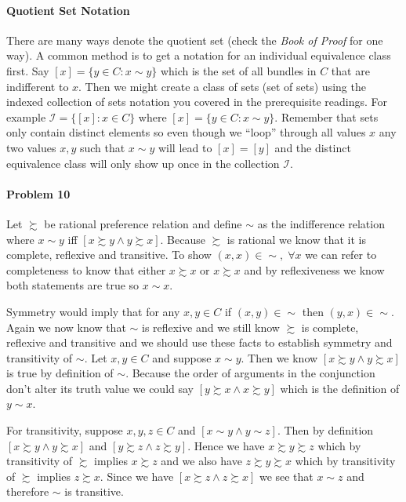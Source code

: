 \documentclass[10pt]{article}
\begin{document}
\paragraph{Quotient Set Notation}
There are many ways denote the quotient set (check the \emph{Book of Proof} for one way).
A common method is to get a notation for an individual equivalence class first.
Say $[x] = \{ y \in C: x \sim y\}$ which is the set of all bundles in $C$ that are indifferent to $x$.
Then we might create a class of sets (set of sets) using the indexed collection of sets notation you covered in the prerequisite readings.
For example $\mathcal{I} = \{ [x] : x \in C\}$ where $[x]=\{ y \in C: x \sim y\}$.
Remember that sets only contain distinct elements so even though we ``loop'' through all values $x$ any two values $x,y$ such that $x \sim y$ will lead to $[x] = [y]$ and the distinct equivalence class will only show up once in the collection $\mathcal{I}$.

\paragraph{Problem 10}
Let $\succsim$ be rational preference relation and define $\sim$ as the indifference relation where $x\sim y$ iff $[x\succsim y \wedge y\succsim x]$.
Because $\succsim$ is rational we know that it is complete, reflexive and transitive.
To show $(x,x) \in \sim, \; \forall x$ we can refer to completeness to know that either $x\succsim x$ or $x\succsim x$ and by reflexiveness we know both statements are true so $x\sim x$.

Symmetry would imply that for any $x,y\in C$ if $(x,y)\in \sim$ then $(y,x) \in \sim$.
Again we now know that $\sim$ is reflexive and we still know $\succsim$ is complete, reflexive and transitive and we should use these facts to establish symmetry and transitivity of $\sim$.
Let $x,y\in C$ and suppose $x \sim y$.
Then we know $[x\succsim y \wedge y\succsim x]$ is true by definition of $\sim$.
Because the order of arguments in the conjunction don't alter its truth value we could say
$[y\succsim x \wedge x \succsim y]$ which is the definition of $y\sim x$.

For transitivity, suppose $x,y,z \in C$ and $[x\sim y \wedge y \sim z]$.
Then by definition $[x\succsim y \wedge y\succsim x]$ and $[y\succsim z \wedge z\succsim y]$.
Hence we have $x \succsim y \succsim z$ which by transitivity of $\succsim$ implies $x\succsim z$ and we also have $z\succsim y \succsim x$ which by transitivity of $\succsim$ implies $z\succsim x$.
Since we have $[x\succsim z \wedge z\succsim x]$ we see that $x \sim z$ and therefore $\sim$ is transitive.
\end{document}
